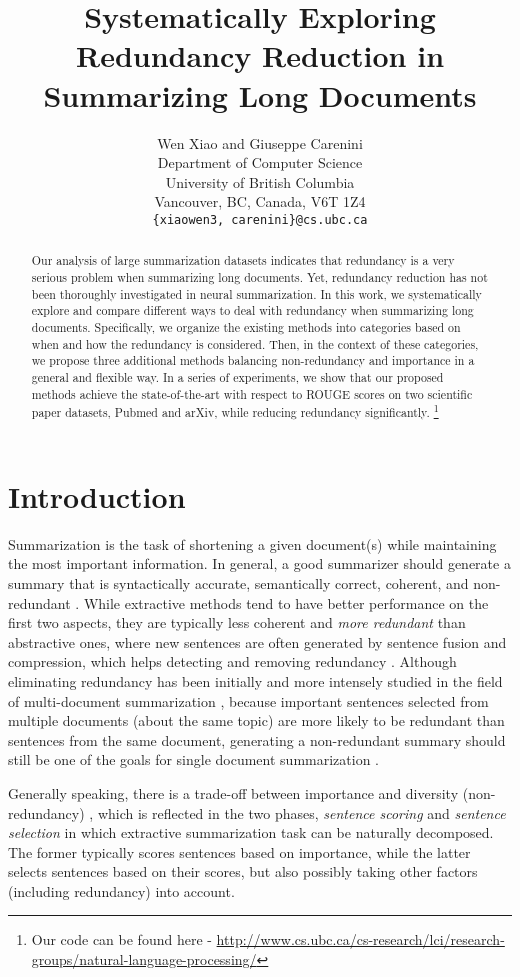 \documentclass[11pt,a4paper]{article}
\title{Systematically Exploring Redundancy Reduction in \\ Summarizing Long Documents}
\author{Wen Xiao and Giuseppe Carenini\\
  Department of Computer Science \\
  University of British Columbia \\
  Vancouver, BC, Canada, V6T 1Z4 \\
  {\tt \{xiaowen3, carenini\}@cs.ubc.ca}}
\date{}
\begin{document}
\maketitle
\begin{abstract}
Our analysis of large
summarization datasets indicates that redundancy is a very serious problem when summarizing long documents. Yet, redundancy reduction has not been thoroughly investigated in neural summarization. In this work, we systematically explore and compare different ways to deal with redundancy when summarizing long documents. Specifically, we organize the existing methods into categories based on when and how the redundancy is considered. Then, in the context of these categories, we propose three additional methods balancing non-redundancy and importance in a general and flexible way.
In a series of experiments, we show that our proposed methods achieve the state-of-the-art with respect to ROUGE scores on two scientific paper datasets, Pubmed and arXiv, while reducing redundancy significantly. \footnote{Our code can be found here -  \url{http://www.cs.ubc.ca/cs-research/lci/research-groups/natural-language-processing/}}

\end{abstract}

\section{Introduction}


Summarization is the task of shortening a given document(s) while maintaining the most important information. In general, a good summarizer should generate a summary that is syntactically accurate, semantically correct, coherent, and non-redundant  \cite{summary_eval}. While extractive methods tend to have better performance on the first two aspects, they are typically  less coherent and {\it more redundant} than abstractive ones, where new sentences are often generated by sentence fusion and compression, which helps detecting and removing redundancy \cite{abstractive_analysing}. Although eliminating redundancy has been  initially and more intensely studied  in the field of multi-document summarization \cite{Tackling_redundancy}, because important sentences selected from multiple documents (about the same topic) are more likely to be redundant than sentences from the same document, generating a non-redundant summary should still be one of the goals for single document summarization \cite{Lin2009}. 


Generally speaking, there is a trade-off between importance and diversity (non-redundancy) \cite{Jung2019}, which is reflected in the two phases, \textit{sentence scoring} and \textit{sentence selection} \cite{NeuSum} in which extractive summarization task can be naturally decomposed. The former typically scores sentences based on importance, while the latter selects sentences based on their scores, but also possibly taking other factors (including redundancy) into account.
\end{document}
